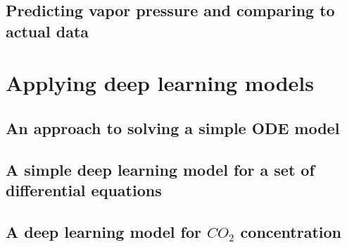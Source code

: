 \documentclass[a4paper]{article}
\begin{document}
\subsection{Predicting vapor pressure and comparing to actual data}


\newpage
\section{Applying deep learning models}
\subsection{An approach to solving a simple ODE model}

\subsection{A simple deep learning model for a set of differential equations}

\subsection{A deep learning model for \(CO_2\) concentration}

\newpage
\printbibliography[heading=bibintoc]
\end{document}
